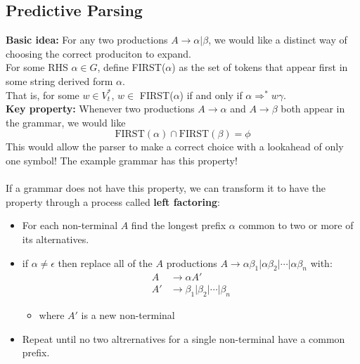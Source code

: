 \documentclass[10pt]{article}
\begin{document}
\subsection*{Predictive Parsing}
\textbf{Basic idea:} For any two productions $A \rightarrow \alpha \vert \beta$, we would like a distinct way of choosing the correct produciton to expand.\\
For some RHS $\alpha \in G$, define FIRST($\alpha$) as the set of tokens that appear first in some string derived form $\alpha$.\\
That is, for some $w \in V_t^*$, $w \in$ FIRST($\alpha$) if and only if $\alpha \Rightarrow^* w\gamma$.\\
\textbf{Key property:} Whenever two productions $A \rightarrow \alpha$ and $A \rightarrow \beta$ both appear in the grammar, we would like
\[\text{FIRST}(\alpha)\cap\text{FIRST}(\beta) = \phi\]
This would allow the parser to make a correct choice with a lookahead of only one symbol!  The example grammar has this property!\\\\
If a grammar does not have this property, we can transform it to have the property through a process called \textbf{left factoring}:
\begin{itemize}
    \item For each non-terminal $A$ find the longest prefix $\alpha$ common to two or more of its alternatives.
    \item if $\alpha \neq \epsilon$ then replace all of the $A$ productions $A \rightarrow \alpha \beta_1 \vert \alpha \beta_2 \vert \cdots \vert \alpha\beta_n$ with:
    \begin{align*}
        A &\rightarrow \alpha A'\\
        A' &\rightarrow \beta_1 \vert \beta_2 \vert \cdots \vert \beta_n
    \end{align*}
    \begin{itemize}
        \item where $A'$ is a new non-terminal
    \end{itemize}   
    \item Repeat until no two altrernatives for a single non-terminal have a common prefix.
\end{itemize}
\end{document}
